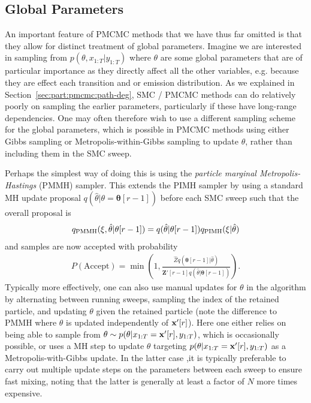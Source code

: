 \subsection{Global Parameters}
\label{sec:part:pmcmc:global}

An important feature of PMCMC methods that we have thus far omitted is that they allow for
distinct treatment of global parameters.  Imagine we are interested in sampling from $p(\theta,x_{1:T} | y_{1:T})$
where $\theta$ are some global parameters that are of particular importance as they directly
affect all the other variables, e.g. because they are effect each transition and or emission distribution.
As we explained in Section~\ref{sec:part:pmcmc:path-deg}, SMC / PMCMC methods can do relatively poorly on sampling
the earlier parameters, particularly if these have long-range dependencies. One may often therefore wish 
to use a different sampling scheme
for the global parameters, which is possible in PMCMC methods using either Gibbs sampling or Metropolis-within-Gibbs
sampling to update $\theta$, rather than including them in the SMC sweep.

Perhaps the simplest way of doing this is using the \emph{particle marginal Metropolis-Hastings} (PMMH)
sampler.  This extends the PIMH sampler by using a standard MH update proposal $q(\hat{\theta}|\theta=\mathbf{\theta}[r-1])$ 
before each SMC sweep such that the overall proposal is
\begin{align}
q_{\text{PMMH}}(\mathbf{\xi},\hat{\theta}|\mathbf{\theta}[r-1]) = q(\hat{\theta}|\mathbf{\theta}[r-1]) 
q_{\text{PIMH}}(\mathbf{\xi} | \hat{\theta})
\end{align}
and samples are now accepted with probability
\begin{align}
P(\text{Accept}) = \min \left(1,\frac{\hat{Z} q(\mathbf{\theta}[r-1] | \hat{\theta})}
{\mathbf{Z}'[r-1] q(\hat{\theta}|\mathbf{\theta}[r-1])}\right).
\end{align}
Typically more effectively, one can also use manual updates for $\theta$ in the \pg algorithm by alternating
between running \csmc sweeps, sampling the index of the retained particle, and updating $\theta$ given
the retained particle (note the difference to PMMH where $\theta$ is updated independently of $\mathbf{x}'[r]$).
Here one either relies on being able to sample from $\theta \sim p(\theta | x_{1:T}=\mathbf{x}'[r], y_{1:T})$, which is 
occasionally possible, or uses a MH step to update $\theta$ targeting $p(\theta | x_{1:T}=\mathbf{x}'[r], y_{1:T})$ as
a Metropolis-with-Gibbs update.  In the latter case ,it is typically preferable to carry out multiple update steps
on the parameters between each \csmc sweep to ensure fast mixing, noting that the latter is generally at least a 
factor of $N$ more times expensive.


